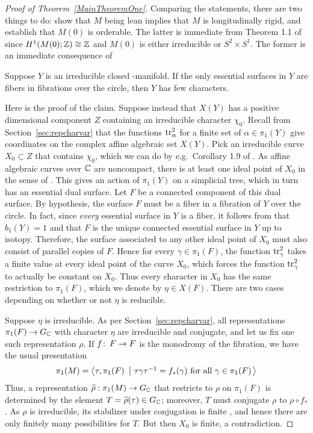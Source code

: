 \documentclass[tikz, sepfignums, defaultenums]{nmd/article}
\newcommand{\GC}{G_\C}
\begin{document}
\begin{proof}[Proof of Theorem~\ref{MainTheoremOne}]
Comparing the statements, there are two things to do: show that $M$
being lean implies that $M$ is longitudinally rigid, and establish
that $M(0)$ is orderable.  The latter is immediate from Theorem 1.1 of
\cite{BoyerRolfsenWiest2005} since $H^1(M(0); {\mathbb Z}) \cong {\mathbb Z}$ and $M(0)$
is either irreducible or $S^2 \times S^1$.  The former is an immediate
consequence of
\begin{claim} \label{claim:fibertofew}
  Suppose $Y$ is an irreducible closed \3-manifold.  If
  the only essential surfaces in $Y$ are fibers in fibrations over the
  circle, then $Y$ has few characters.
\end{claim}
Here is the proof of the claim. Suppose instead that $X(Y)$ has a
positive dimensional component $Z$ containing an irreducible
character $\chi_0$.  Recall from Section~\ref{sec:repcharvar}
that the functions $\operatorname{tr}_\alpha^2$ for a finite set of
$\alpha\in\pi_1(Y)$ give coordinates on the complex affine algebraic
set $X(Y)$.  Pick an irreducible curve $X_0 \subset Z$ that contains
$\chi_0$, which we can do by e.g.~Corollary 1.9 of
\cite{CharlesPoonen2016}. As affine algebraic curves over ${\mathbb C}$ are
noncompact, there is at least one ideal point of $X_0$ in the sense of
\cite[\S 4]{BoyerZhang1998}.  This gives an action of $\pi_1(Y)$ on a
simplicial tree, which in turn has an essential dual surface.  Let $F$
be a connected component of this dual surface.  By hypothesis, the
surface $F$ must be a fiber in a fibration of $Y$ over the
circle. In fact, since \emph{every} essential surface in $Y$ is a
fiber, it follows from \cite[Pages~113--115]{Thurston1986} that
$b_1(Y) = 1$ and that $F$ is the unique connected essential surface
in $Y$ up to isotopy.  Therefore, the surface associated to any other
ideal point of $X_0$ must also consist of parallel copies of $F$.
Hence for every $\gamma \in \pi_1(F)$, the function $\operatorname{tr}^2_\gamma$
takes a finite value at every ideal point of the curve $X_0$, which
forces the function $\operatorname{tr}^2_\gamma$ to actually be constant on $X_0$.
Thus every character in $X_0$ has the same restriction to
$\pi_1(F)$, which we denote by $\eta \in X(F)$.  There are two cases
depending on whether or not $\eta$ is reducible. 

Suppose $\eta$ is irreducible.  As per Section~\ref{sec:repcharvar},
all representations $\pi_1(F) \to \GC$ with character $\eta$ are
irreducible and conjugate, and let us fix one such representation
$\rho$.  If $f \colon\thinspace F \to F$ is the monodromy of the fibration, we
have the usual presentation
\[
  \pi_1(M) = \spandef{\tau, \pi_1(F)}{
    \mbox{$ \tau \gamma \tau^{-1} = f_*(\gamma)$ for all
      $\gamma \in \pi_1(F)$}}
\]
Thus, a representation $\rhohat:\pi_1(M)\to\GC$ that restricts to $\rho$ on
$\pi_1(F)$ is determined by the element $T = \rhohat(\tau) \in \GC$; moreover,
$T$ must conjugate $\rho$ to $\rho \circ f_*$.  As $\rho$
is irreducible, its stabilizer under conjugation is finite
\cite[Proposition~3.16(i)]{HeusenerPorti2004}, and hence there are
only finitely many possibilities for $T$.  But then $X_0$ is finite, a
contradiction.


\end{proof}
\end{document}
